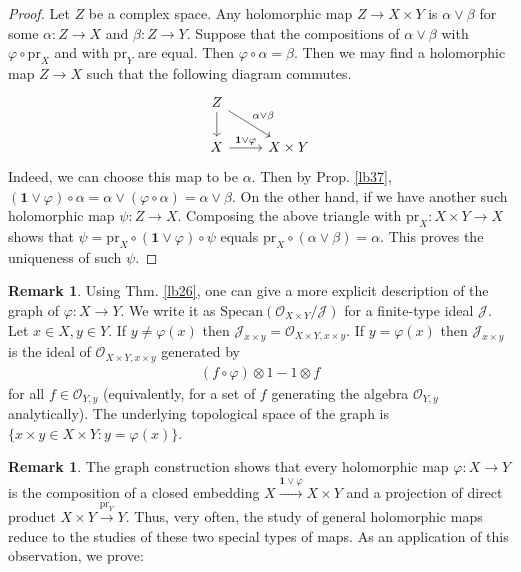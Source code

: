 \documentclass[12pt,b5paper,notitlepage]{report}
\theoremstyle{definition}
\newtheorem{rem}[df]{Remark}
\theoremstyle{plain}
\newcommand{\mc}{\mathcal}
\newcommand{\id}{\mathbf{1}}
\newcommand{\scr}{\mathscr}
\newcommand{\pr}{\mathrm {pr}}
\newcommand{\Specan}{\mathrm{Specan}}
\numberwithin{equation}{section}
\begin{document}
\begin{proof}
Let $Z$ be a complex space. Any holomorphic map $Z\rightarrow X\times Y$ is $\alpha\vee\beta$ for some $\alpha:Z\rightarrow X$ and $\beta:Z\rightarrow Y$. Suppose that the compositions of $\alpha\vee\beta$ with $\varphi\circ\pr_X$ and with $\pr_Y$ are equal. Then $\varphi\circ\alpha=\beta$. Then we may find a holomorphic map $Z\rightarrow X$ such that the following diagram commutes.
\begin{equation*}
\begin{tikzcd}
Z \arrow[d] \arrow[rd, "\alpha\vee\beta"] &           \\
X \arrow[r, "\id\vee\varphi"]             & X\times Y
\end{tikzcd}
\end{equation*}
Indeed, we can choose this map to be $\alpha$. Then by Prop. \ref{lb37}, $(\id\vee\varphi)\circ\alpha=\alpha\vee(\varphi\circ\alpha)=\alpha\vee\beta$. On the other hand, if we have another such holomorphic map $\psi:Z\rightarrow X$. Composing the above triangle with $\pr_X:X\times Y\rightarrow X$ shows that $\psi=\pr_X\circ(\id\vee\varphi)\circ\psi$ equals $\pr_X\circ (\alpha\vee\beta)=\alpha$. This proves the uniqueness of such $\psi$.
\end{proof}




\begin{rem}\label{lb15}
Using Thm. \ref{lb26}, one can give a more explicit description of the graph of $\varphi:X\rightarrow Y$. We write it as $\Specan(\scr O_{X\times Y}/\mc J)$ for a finite-type ideal $\mc J$. Let $x\in X,y\in Y$. If $y\neq\varphi(x)$ then $\mc J_{x\times y}=\scr O_{X\times Y,x\times y}$. If $y=\varphi(x)$ then $\mc J_{x\times y}$ is the ideal of $\scr O_{X\times Y,x\times y}$ generated by
\begin{align}
(f\circ\varphi)\otimes 1-1\otimes f
\end{align}
for all $f\in\scr O_{Y,y}$ (equivalently, for a set of $f$ generating the algebra $\scr O_{Y,y}$ analytically). The underlying topological space of the graph is $\{x\times y\in X\times Y:y=\varphi(x)\}$.
\end{rem}

\begin{rem}\label{lb40}
The graph construction shows that every holomorphic map $\varphi:X\rightarrow Y$ is the composition of a closed embedding $X\xrightarrow{\id\vee\varphi}X\times Y$ and a projection of direct product $X\times Y\xrightarrow{\pr_Y}Y$. Thus, very often, the study of general holomorphic maps reduce to the studies of these two special types of maps. As an application of this observation, we prove:
\end{rem}
\end{document}
